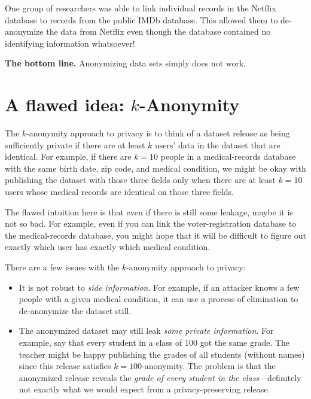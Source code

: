 \documentclass[
  letterpaper,
]{scrbook}
\providecommand{\tightlist}{%
  \setlength{\itemsep}{0pt}\setlength{\parskip}{0pt}}
\theoremstyle{definition}
\theoremstyle{plain}
\theoremstyle{plain}
\theoremstyle{remark}
\begin{document}
One group of researchers was able to link individual records in the
Netflix database to records from the public IMDb database. This allowed
them to de-anonymize the data from Netflix even though the database
contained no identifying information whatsoever!

\textbf{The bottom line.} Anonymizing data sets simply does not work.

\section{\texorpdfstring{A flawed idea:
\(k\)-Anonymity}{A flawed idea: k-Anonymity}}\label{a-flawed-idea-k-anonymity}

The \(k\)-anonymity approach to privacy is to think of a dataset release
as being sufficiently private if there are at least \(k\) users' data in
the dataset that are identical. For example, if there are \(k=10\)
people in a medical-records database with the same birth date, zip code,
and medical condition, we might be okay with publishing the dataset with
those three fields only when there are at least \(k=10\) users whose
medical records are identical on those three fields.

The flawed intuition here is that even if there is still some leakage,
maybe it is not so bad. For example, even if you can link the
voter-registration database to the medical-records database, you might
hope that it will be difficult to figure out exactly which user has
exactly which medical condition.

There are a few issues with the \(k\)-anonymity approach to privacy:

\begin{itemize}
\tightlist
\item
  It is not robust to \emph{side information}. For example, if an
  attacker knows a few people with a given medical condition, it can use
  a process of elimination to de-anonymize the dataset still.
\item
  The anonymized dataset may still leak \emph{some private information}.
  For example, say that every student in a class of 100 got the same
  grade. The teacher might be happy publishing the grades of all
  students (without names) since this release satisfies
  \(k=100\)-anonymity. The problem is that the anonymized release
  reveals the \emph{grade of every student in the class}---definitely
  not exactly what we would expect from a privacy-preserving release.
\end{itemize}
\end{document}
